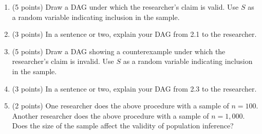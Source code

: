 \documentclass[10pt]{article}
\begin{document}
\begin{enumerate}
    \item (5 points) Draw a DAG under which the researcher's claim is valid. Use $S$ as a random variable indicating inclusion in the sample.
    \item (3 points) In a sentence or two, explain your DAG from 2.1 to the researcher.
    \item (5 points) Draw a DAG showing a counterexample under which the researcher's claim is invalid. Use $S$ as a random variable indicating inclusion in the sample.
    \item (3 points) In a sentence or two, explain your DAG from 2.3 to the researcher.
    \item (2 points) One researcher does the above procedure with a sample of $n = 100$. Another researcher does the above procedure with a sample of $n = 1,000$. Does the size of the sample affect the validity of population inference?
\end{enumerate}
\end{document}
